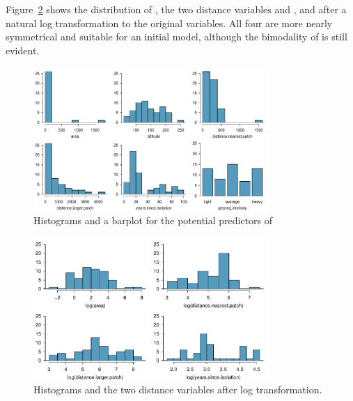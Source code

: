 Figure~\ref{forestbirdsLogPredictorDist} shows the distribution of , the two distance variables  and , and  after a natural log transformation to the original variables.  All four are more nearly symmetrical and suitable for an initial model, although the bimodality of  is still evident.


\begin{figure}[h!]
	\centering
	\includegraphics[width=0.8\textwidth]
	{ch_multiple_linear_regression_oi_biostat/figures/forestbirdsPredictorDist/forestbirdsPredictorDist.pdf}
    \caption{Histograms and a barplot for the potential predictors of }
   	\label{forestbirdsPredictorDist}
\end{figure}

\begin{figure}[h!]
	\centering
	\includegraphics[width=0.8\textwidth]
	{ch_multiple_linear_regression_oi_biostat/figures/forestbirdsLogPredictorDist/forestbirdsLogPredictorDist.pdf}
    \caption{Histograms  and the two distance variables after log transformation.}
   	\label{forestbirdsLogPredictorDist}
\end{figure}


